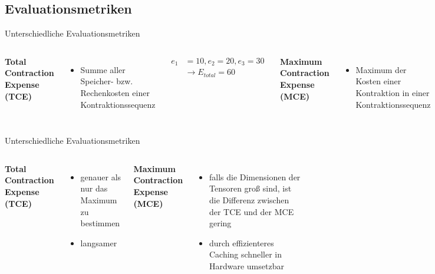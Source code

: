 \documentclass{beamer}
\begin{document}
\subsection{Evaluationsmetriken}

\begin{frame}{Unterschiedliche Evaluationsmetriken}
	\begin{columns}[]

		\textbf{Total Contraction Expense (TCE)}
		\begin{itemize}
			\item Summe aller Speicher- bzw. Rechenkosten einer Kontraktionssequenz
		\end{itemize}
		\begin{align*}
			e_1 & = 10, e_2 = 20, e_3 = 30   \\
			    & \rightarrow E_{total} = 60
		\end{align*}


		\textbf{Maximum Contraction Expense (MCE)}
		\begin{itemize}
			\item Maximum der Kosten einer Kontraktion in einer Kontraktionssequenz
		\end{itemize}
		\begin{align*}
			e_1 & = 10, e_2 = 20, e_3 = 30 \\
			    & \rightarrow E_{max} = 30
		\end{align*}
	\end{columns}
\end{frame}

\begin{frame}{Unterschiedliche Evaluationsmetriken}
	\begin{columns}
		\textbf{Total Contraction Expense (TCE)}
		\begin{itemize}
			\item genauer als nur das Maximum zu bestimmen
			\item langsamer
		\end{itemize}


		\textbf{Maximum Contraction Expense (MCE)}
		\begin{itemize}
			\item falls die Dimensionen der Tensoren groß sind, ist die Differenz zwischen der TCE und der MCE gering
			\item durch effizienteres Caching schneller in Hardware umsetzbar
		\end{itemize}

	\end{columns}
\end{frame}
\end{document}
